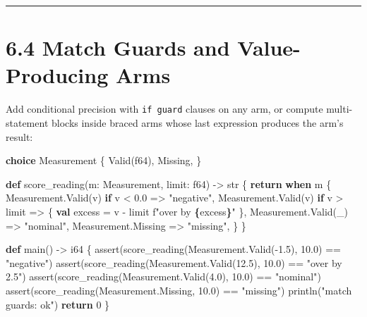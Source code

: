 \documentclass[
  english,
  oneside]{book}
\newenvironment{Shaded}{\begin{snugshade}}{\end{snugshade}}
\newcommand{\ControlFlowTok}[1]{\textcolor[rgb]{0.77,0.53,0.75}{\textbf{#1}}}
\newcommand{\DataTypeTok}[1]{\textcolor[rgb]{0.31,0.79,0.69}{#1}}
\newcommand{\DecValTok}[1]{\textcolor[rgb]{0.71,0.81,0.66}{#1}}
\newcommand{\FloatTok}[1]{\textcolor[rgb]{0.71,0.81,0.66}{#1}}
\newcommand{\FunctionTok}[1]{\textcolor[rgb]{0.86,0.86,0.67}{#1}}
\newcommand{\KeywordTok}[1]{\textcolor[rgb]{0.34,0.61,0.84}{\textbf{#1}}}
\newcommand{\NormalTok}[1]{\textcolor[rgb]{0.83,0.83,0.83}{#1}}
\newcommand{\OperatorTok}[1]{\textcolor[rgb]{0.83,0.83,0.83}{#1}}
\newcommand{\StringTok}[1]{\textcolor[rgb]{0.81,0.57,0.47}{#1}}
\begin{document}
\begin{center}\rule{0.5\linewidth}{0.5pt}\end{center}

\section{6.4 Match Guards and Value-Producing
Arms}\label{match-guards-and-value-producing-arms}

Add conditional precision with \texttt{if\ guard} clauses on any arm, or
compute multi-statement blocks inside braced arms whose last expression
produces the arm's result:

\begin{Shaded}
\begin{Highlighting}[]
\KeywordTok{choice}\NormalTok{ Measurement \{}
\NormalTok{    Valid(}\DataTypeTok{f64}\NormalTok{),}
\NormalTok{    Missing,}
\NormalTok{\}}

\KeywordTok{def}\NormalTok{ score\_reading(m: Measurement, limit: }\DataTypeTok{f64}\NormalTok{) }\OperatorTok{{-}\textgreater{}} \DataTypeTok{str}\NormalTok{ \{}
    \ControlFlowTok{return} \ControlFlowTok{when}\NormalTok{ m \{}
\NormalTok{        Measurement}\OperatorTok{.}\NormalTok{Valid(v) }\ControlFlowTok{if}\NormalTok{ v }\OperatorTok{\textless{}} \FloatTok{0.0} \OperatorTok{=\textgreater{}} \StringTok{"negative"}\NormalTok{,}
\NormalTok{        Measurement}\OperatorTok{.}\NormalTok{Valid(v) }\ControlFlowTok{if}\NormalTok{ v }\OperatorTok{\textgreater{}}\NormalTok{ limit }\OperatorTok{=\textgreater{}}\NormalTok{ \{}
            \KeywordTok{val}\NormalTok{ excess }\OperatorTok{=}\NormalTok{ v }\OperatorTok{{-}}\NormalTok{ limit}
            \StringTok{f"over by }\ControlFlowTok{\{}\NormalTok{excess}\ControlFlowTok{\}}\StringTok{"}
\NormalTok{        \},}
\NormalTok{        Measurement}\OperatorTok{.}\NormalTok{Valid(\_) }\OperatorTok{=\textgreater{}} \StringTok{"nominal"}\NormalTok{,}
\NormalTok{        Measurement}\OperatorTok{.}\NormalTok{Missing }\OperatorTok{=\textgreater{}} \StringTok{"missing"}\NormalTok{,}
\NormalTok{    \}}
\NormalTok{\}}

\KeywordTok{def}\NormalTok{ main() }\OperatorTok{{-}\textgreater{}} \DataTypeTok{i64}\NormalTok{ \{}
    \FunctionTok{assert}\NormalTok{(score\_reading(Measurement}\OperatorTok{.}\NormalTok{Valid(}\OperatorTok{{-}}\FloatTok{1.5}\NormalTok{), }\FloatTok{10.0}\NormalTok{) }\OperatorTok{==} \StringTok{"negative"}\NormalTok{)}
    \FunctionTok{assert}\NormalTok{(score\_reading(Measurement}\OperatorTok{.}\NormalTok{Valid(}\FloatTok{12.5}\NormalTok{), }\FloatTok{10.0}\NormalTok{) }\OperatorTok{==} \StringTok{"over by 2.5"}\NormalTok{)}
    \FunctionTok{assert}\NormalTok{(score\_reading(Measurement}\OperatorTok{.}\NormalTok{Valid(}\FloatTok{4.0}\NormalTok{), }\FloatTok{10.0}\NormalTok{) }\OperatorTok{==} \StringTok{"nominal"}\NormalTok{)}
    \FunctionTok{assert}\NormalTok{(score\_reading(Measurement}\OperatorTok{.}\NormalTok{Missing, }\FloatTok{10.0}\NormalTok{) }\OperatorTok{==} \StringTok{"missing"}\NormalTok{)}
\NormalTok{    println(}\StringTok{"match guards: ok"}\NormalTok{)}
    \ControlFlowTok{return} \DecValTok{0}
\NormalTok{\}}
\end{Highlighting}
\end{Shaded}
\end{document}
